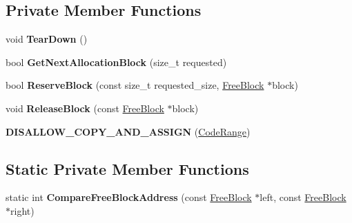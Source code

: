 \subsection*{Private Member Functions}
\begin{DoxyCompactItemize}
\item 
void {\bfseries Tear\+Down} ()\hypertarget{classv8_1_1internal_1_1_code_range_a1c0a54e3aff48da76ebb4dea2b69ca37}{}\label{classv8_1_1internal_1_1_code_range_a1c0a54e3aff48da76ebb4dea2b69ca37}

\item 
bool {\bfseries Get\+Next\+Allocation\+Block} (size\+\_\+t requested)\hypertarget{classv8_1_1internal_1_1_code_range_ab426857d0e5d7dd2fa8fcc58c90a7424}{}\label{classv8_1_1internal_1_1_code_range_ab426857d0e5d7dd2fa8fcc58c90a7424}

\item 
bool {\bfseries Reserve\+Block} (const size\+\_\+t requested\+\_\+size, \hyperlink{classv8_1_1internal_1_1_code_range_1_1_free_block}{Free\+Block} $\ast$block)\hypertarget{classv8_1_1internal_1_1_code_range_ae4b3125115c3b73baef0ddc37152704c}{}\label{classv8_1_1internal_1_1_code_range_ae4b3125115c3b73baef0ddc37152704c}

\item 
void {\bfseries Release\+Block} (const \hyperlink{classv8_1_1internal_1_1_code_range_1_1_free_block}{Free\+Block} $\ast$block)\hypertarget{classv8_1_1internal_1_1_code_range_a1a157bdcdd2c87d27e5acef3e07462f7}{}\label{classv8_1_1internal_1_1_code_range_a1a157bdcdd2c87d27e5acef3e07462f7}

\item 
{\bfseries D\+I\+S\+A\+L\+L\+O\+W\+\_\+\+C\+O\+P\+Y\+\_\+\+A\+N\+D\+\_\+\+A\+S\+S\+I\+GN} (\hyperlink{classv8_1_1internal_1_1_code_range}{Code\+Range})\hypertarget{classv8_1_1internal_1_1_code_range_a46a0e9856e0881eb3f9ae82cf9f12502}{}\label{classv8_1_1internal_1_1_code_range_a46a0e9856e0881eb3f9ae82cf9f12502}

\end{DoxyCompactItemize}
\subsection*{Static Private Member Functions}
\begin{DoxyCompactItemize}
\item 
static int {\bfseries Compare\+Free\+Block\+Address} (const \hyperlink{classv8_1_1internal_1_1_code_range_1_1_free_block}{Free\+Block} $\ast$left, const \hyperlink{classv8_1_1internal_1_1_code_range_1_1_free_block}{Free\+Block} $\ast$right)\hypertarget{classv8_1_1internal_1_1_code_range_a68bc3c5cddc6eb004f610667e1fe7be6}{}\label{classv8_1_1internal_1_1_code_range_a68bc3c5cddc6eb004f610667e1fe7be6}

\end{DoxyCompactItemize}
